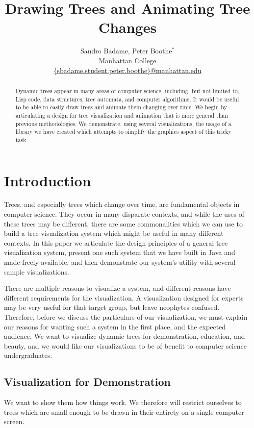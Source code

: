\documentclass{article}
\title{Drawing Trees and Animating Tree Changes}
\author{Sandro Badame, Peter Boothe$^*$\\
 Manhattan College\\
\url{{sbadame.student,peter.boothe}@manhattan.edu}}
\begin{document}
\maketitle

\begin{abstract}
Dynamic trees appear in many areas of computer science, including, but not
limited to, Lisp code, data structures, tree automata, and computer
algorithms.  It would be useful to be able to easily draw trees and animate
them changing over time.  We begin by articulating a design for tree
visualization and animation that is more general than previous methodologies.
We demonstrate, using several visualizations, the
usage of a library we have created which attempts to simplify the graphics
aspect of this tricky task.\end{abstract}

\section{Introduction}
Trees, and especially trees which change over time, are fundamental objects in
computer science.  They occur in many disparate contexts, and while the uses of
these trees may be different, there are some commonalities which we can use to
build a tree visualization system which might be useful in many different
contexts.  In this paper we articulate the design principles of a general tree visualization system, present one such system that we have built in Java and made freely available, and then demonstrate our system's utility with several sample visualizations.

There are multiple reasons to visualize a system, and different reasons have
different requirements for the visualization.  A visualization designed for
experts may be very useful for that target group, but leave neophytes
confused.  Therefore, before we discuss the particulars of our visualization,
we must explain our reasons for wanting such a system in the first place, and
the expected audience.  We want to visualize dynamic trees for demonstration,
education, and beauty, and we would like our visualizations to be of benefit to
computer science undergraduates.

\subsection{Visualization for Demonstration}

We want to show them how things work.  We therefore will restrict ourselves to trees which are small enough to be drawn in their entirety on a single computer screen.
\end{document}
